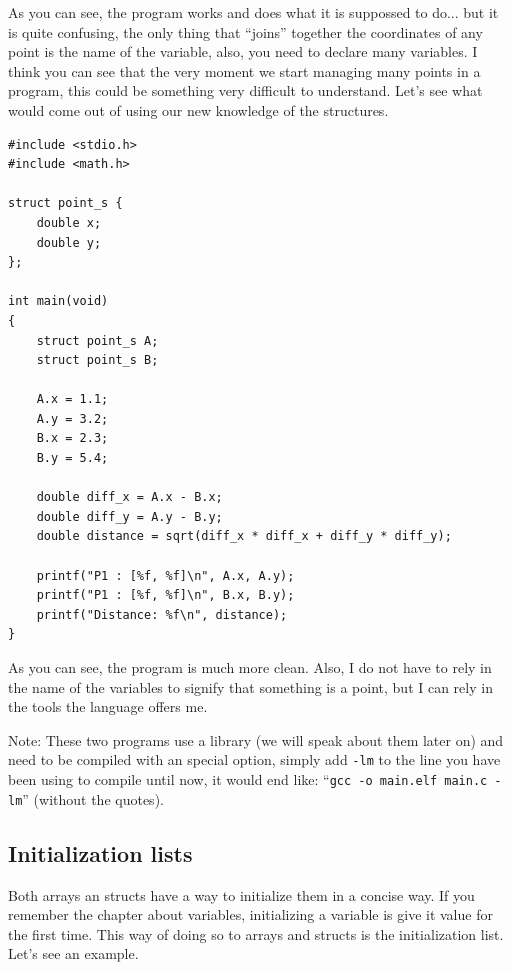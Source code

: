 \documentclass[a4paper]{article}
\begin{document}
As you can see, the program works and does what it is suppossed to do... but
it is quite confusing, the only thing that ``joins'' together the coordinates
of any point is the name of the variable, also, you need to declare many
variables. I think you can see that the very moment we start managing many
points in a program, this could be something very difficult to understand.
Let's see what would come out of using our new knowledge of the structures.

\noindent
\begin{minipage}[H]{\linewidth}
\mbox{}
\begin{lstlisting}[style=C,
caption={Calculating the distance between two points using structures},
label={lst:pointStruct}]
#include <stdio.h>
#include <math.h>

struct point_s {
    double x;
    double y;
};

int main(void)
{
    struct point_s A;
    struct point_s B;

    A.x = 1.1;
    A.y = 3.2;
    B.x = 2.3;
    B.y = 5.4;

    double diff_x = A.x - B.x;
    double diff_y = A.y - B.y;
    double distance = sqrt(diff_x * diff_x + diff_y * diff_y);

    printf("P1 : [%f, %f]\n", A.x, A.y);
    printf("P1 : [%f, %f]\n", B.x, B.y);
    printf("Distance: %f\n", distance);
}
\end{lstlisting}
\end{minipage}

As you can see, the program is much more clean. Also, I do not have to rely in
the name of the variables to signify that something is a point, but I can
rely in the tools the language offers me.

Note: These two programs use a library (we will speak about them later on)
and need to be compiled with an special option, simply add \texttt{-lm} to the
line you have been using to compile until now, it would end like:
``\texttt{gcc -o main.elf main.c -lm}'' (without the quotes).

\subsection{Initialization lists}
Both arrays an structs have a way to initialize them in a concise way. If you
remember the chapter about variables, initializing a variable is give it
value for the first time. This way of doing so to arrays and structs is the
initialization list. Let's see an example.
\end{document}
